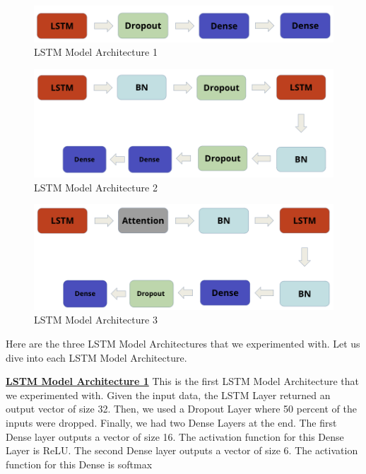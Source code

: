 \documentclass[conference]{IEEEtran}
\begin{document}
\begin{figure}[h!]
	\includegraphics[width= 0.9 \linewidth]{LSTM(1).png}
	\centering
	\caption{LSTM Model Architecture 1}
	\label{LSTM(1).png}
\end{figure}

\begin{figure}[h!]
	\includegraphics[width= 0.9 \linewidth]{LSTM(2).png}
	\centering
	\caption{LSTM Model Architecture 2}
	\label{LSTM(2).png}
\end{figure}


\begin{figure}[h!]
	\includegraphics[width= 0.9 \linewidth]{LSTM(3).png}
	\centering
	\caption{LSTM Model Architecture 3}
	\label{LSTM(3).png}
\end{figure}

Here are the three LSTM Model Architectures that we experimented with. Let us dive into each LSTM Model Architecture. 

\textbf{\underline{LSTM Model Architecture 1}} \newline 
This is the first LSTM Model Architecture that we experimented with. Given the input data, the LSTM Layer returned an output vector of size 32. Then, we used a Dropout Layer where 50 percent of the inputs were dropped. Finally, we had two Dense Layers at the end. The first Dense layer outputs a vector of size 16. The activation function for this Dense Layer is ReLU. The second Dense layer outputs a vector of size 6. The activation function for this Dense is softmax \newline 
\end{document}
